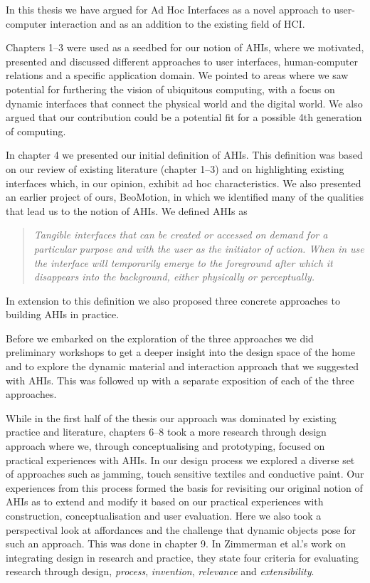 
In this thesis we have argued for Ad Hoc Interfaces as a novel approach to user-computer interaction and as an addition to the existing field of HCI.

Chapters 1--3 were used as a seedbed for our notion of AHIs, where we motivated, presented and discussed different approaches to user interfaces, human-computer relations and a specific application domain.
We pointed to areas where we saw potential for furthering the vision of ubiquitous computing, with a focus on dynamic interfaces that connect the physical world and the digital world.
We also argued that our contribution could be a potential fit for a possible 4th generation of computing.  

In chapter 4 we presented our initial definition of AHIs.
This definition was based on our review of existing literature (chapter 1--3) and on highlighting existing interfaces which, in our opinion, exhibit ad hoc characteristics.
We also presented an earlier project of ours, BeoMotion, in which we identified many of the qualities that lead us to the notion of AHIs.
We defined AHIs as 

\begin{quotation}
\emph{Tangible interfaces that can be created or accessed on demand for a particular purpose and with the user as the initiator of action. When in use the interface will temporarily emerge to the foreground after which it disappears into the background, either physically or perceptually.}
\end{quotation}
In extension to this definition we also proposed three concrete approaches to building AHIs in practice.

Before we embarked on the exploration of the three approaches we did preliminary workshops to get a deeper insight into the design space of the home and to explore the dynamic material and interaction approach that we suggested with AHIs.
This was followed up with a separate exposition of each of the three approaches.

While in the first half of the thesis our approach was dominated by existing practice and literature, chapters 6--8 took a more research through design approach where we, through conceptualising and prototyping, focused on practical experiences with AHIs.
In our design process we explored a diverse set of approaches such as jamming, touch sensitive textiles and conductive paint.
Our experiences from this process formed the basis for revisiting our original notion of AHIs as to extend and modify it based on our practical experiences with construction, conceptualisation and user evaluation.
Here we also took a perspectival look at affordances and the challenge that dynamic objects pose for such an approach.
This was done in chapter 9.
\blank
In Zimmerman et al.'s \citep{zimmerman2007research} work on integrating design in research and practice, they state four criteria for evaluating research through design, \emph{process}, \emph{invention}, \emph{relevance} and \emph{extensibility}.

